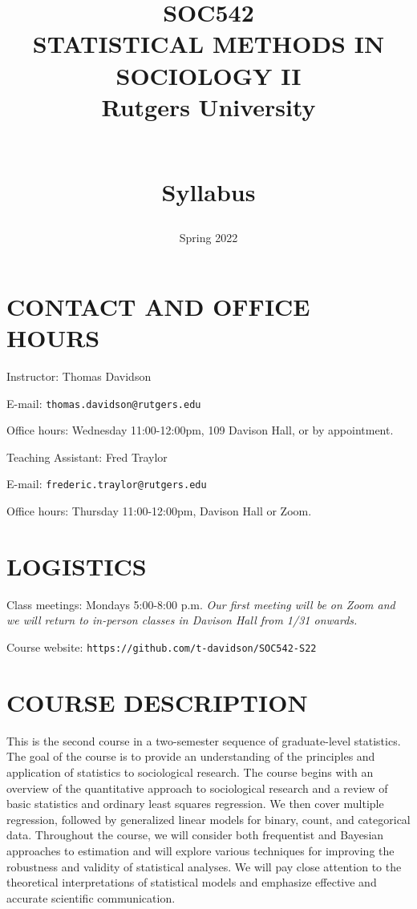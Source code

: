\documentclass[
  10pt,
]{article}
\title{SOC542\\
\hspace*{0.333em}STATISTICAL METHODS IN SOCIOLOGY II\\
Rutgers University\\
\strut \\
\hspace*{0.333em}Syllabus}
\author{}
\date{\vspace{-2.5em}Spring 2022}
\begin{document}
\maketitle

\hypertarget{contact-and-office-hours}{%
\section{CONTACT AND OFFICE HOURS}\label{contact-and-office-hours}}

Instructor: Thomas Davidson

E-mail: \texttt{thomas.davidson@rutgers.edu}

Office hours: Wednesday 11:00-12:00pm, 109 Davison Hall, or by
appointment.

Teaching Assistant: Fred Traylor

E-mail: \texttt{frederic.traylor@rutgers.edu}

Office hours: Thursday 11:00-12:00pm, Davison Hall or Zoom.

\hypertarget{logistics}{%
\section{LOGISTICS}\label{logistics}}

Class meetings: Mondays 5:00-8:00 p.m. \emph{Our first meeting will be
on Zoom and we will return to in-person classes in Davison Hall from
1/31 onwards.}

Course website: \texttt{https://github.com/t-davidson/SOC542-S22}

\hypertarget{course-description}{%
\section{COURSE DESCRIPTION}\label{course-description}}

This is the second course in a two-semester sequence of graduate-level
statistics. The goal of the course is to provide an understanding of the
principles and application of statistics to sociological research. The
course begins with an overview of the quantitative approach to
sociological research and a review of basic statistics and ordinary
least squares regression. We then cover multiple regression, followed by
generalized linear models for binary, count, and categorical data.
Throughout the course, we will consider both frequentist and Bayesian
approaches to estimation and will explore various techniques for
improving the robustness and validity of statistical analyses. We will
pay close attention to the theoretical interpretations of statistical
models and emphasize effective and accurate scientific communication.
\end{document}
